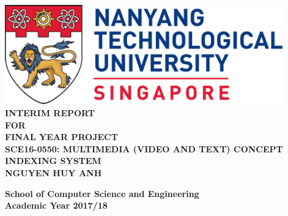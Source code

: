 \begin{titlepage}
\begin{center}

\includegraphics[width=0.9\textwidth]{images/ntu_logo.png}
\\[4cm]

\uppercase{\textbf{Interim Report}\\
\textbf{for}\\
\textbf{Final Year Project}
\\[2cm]
\textbf{SCE16-0550: Multimedia (video and text) Concept Indexing System}
\\[2cm]
\textbf{Nguyen Huy Anh}
}

\vfill

\textbf{School of Computer Science and Engineering}
\\
\textbf{Academic Year 2017/18}

\end{center}
\end{titlepage}

